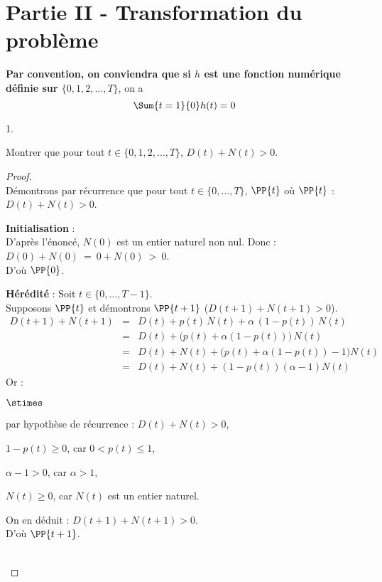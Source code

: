 \documentclass[11pt]{article}%
\begin{document}
\section*{Partie II - Transformation du problème}

\noindent
{\bf Par convention, on conviendra que si $h$ est une fonction 
numérique définie sur $\{0,1,2, \ldots, T\}$}, on a
\[
  \Sum{t=1}{0} h(t)=0
\]

\begin{noliste}{1.}
  \setlength{\itemsep}{4mm}
  \setcounter{enumi}{4}
  \item Montrer que pour tout $t \in \{0,1,2, \ldots, T\}$, $D(t) 
  +N(t) >0$.
  
  \begin{proof}~\\
    Démontrons par récurrence que pour tout $t\in \{0, \ldots, T\}$,
    $\PP{t}$ \quad où \quad $\PP{t}$ : $D(t)+N(t) >0$.
    \begin{noliste}{\fitem}
      \item {\bf Initialisation} :\\
      D'après l'énoncé, $N(0)$ est un entier naturel non nul. Donc :
      $D(0) + N(0) \ = \ 0 + N(0) \ > \ 0$.\\
      D'où $\PP{0}$.
      
      \item {\bf Hérédité} : Soit $t\in \{0, \ldots, T-1\}$.\\
      Supposons $\PP{t}$ et démontrons $\PP{t+1}$ (\ie $D(t+1) + 
      N(t+1) >0$).
      \[
        \begin{array}{rcl}
          D(t+1) + N(t+1) &=& D(t) + p(t) \, N(t) + \alpha \, 
          (1-p(t)) \, N(t)
          \\[.2cm]
          &=& D(t) + \big(p(t) + \alpha(1-p(t))\big) \, N(t)
          \\[.2cm]
          &=& D(t) + N(t) + \big(p(t) + \alpha (1-p(t)) -1\big) N(t)
          \\[.2cm]
          &=& D(t) + N(t) + (1-p(t))(\alpha -1) N(t)
        \end{array}
      \]
      Or :
      \begin{noliste}{$\stimes$}
	\item par hypothèse de récurrence : $D(t) + N(t) >0$,
	\item $1-p(t)\geq 0$, car $0<p(t) \leq 1$,
	\item $\alpha -1>0$, car $\alpha >1$,
	\item $N(t) \geq 0$, car $N(t)$ est un entier naturel.
      \end{noliste}
      On en déduit : $D(t+1) + N(t+1) >0$.\\
      D'où $\PP{t+1}$.
    \end{noliste}
    ~\\[-1cm]
  \end{proof}
  

\end{noliste}
\end{document}
